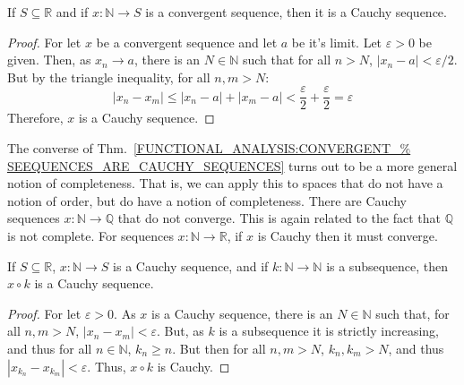             \begin{theorem}
                \label{FUNCTIONAL_ANALYSIS:CONVERGENT_%
                       SEEQUENCES_ARE_CAUCHY_SEQUENCES}
                If $S\subseteq\mathbb{R}$ and if
                $x:\mathbb{N}\rightarrow{S}$
                is a convergent sequence, then it
                is a Cauchy sequence.
            \end{theorem}
            \begin{proof}
                For let $x$ be a convergent sequence and
                let $a$ be it's limit.
                Let $\varepsilon>0$ be given. Then, as
                $x_{n}\rightarrow{a}$, there is an
                $N\in\mathbb{N}$ such that for all $n>N$,
                $|x_{n}-a|<\varepsilon/2$.
                But by the triangle inequality,
                for all $n,m>N$:
                \begin{equation}
                    |x_{n}-x_{m}|\leq
                    |x_{n}-a|+|x_{m}-a|<
                    \frac{\varepsilon}{2}+
                    \frac{\varepsilon}{2}
                    =\varepsilon
                \end{equation}
                Therefore, $x$ is a Cauchy sequence.
            \end{proof}
            The converse of
            Thm.~\ref{FUNCTIONAL_ANALYSIS:CONVERGENT_%
                      SEEQUENCES_ARE_CAUCHY_SEQUENCES}
            turns out to be a more general notion
            of completeness. That is, we can apply
            this to spaces that do not have
            a notion of order, but do have a notion
            of completeness. There are Cauchy sequences
            $x:\mathbb{N}\rightarrow\mathbb{Q}$ that do
            not converge. This is again related to the fact
            that $\mathbb{Q}$ is not complete. For sequences
            $x:\mathbb{N}\rightarrow\mathbb{R}$,
            if $x$ is Cauchy then it must converge.
            \begin{theorem}
                \label{THM:FUNCTIONAL_ANALYSIS:%
                       SUBSEQ_OF_CAUCHY_IS_CAUCHY}
                If $S\subseteq\mathbb{R}$,
                $x:\mathbb{N}\rightarrow{S}$ is a Cauchy sequence,
                and if $k:\mathbb{N}\rightarrow\mathbb{N}$
                is a subsequence, then
                $x\circ{k}$ is a Cauchy sequence.
            \end{theorem}
            \begin{proof}
                For let $\varepsilon>0$. As $x$ is a Cauchy
                sequence, there is an $N\in\mathbb{N}$ such that,
                for all $n,m>N$, $|x_{n}-x_{m}|<\varepsilon$.
                But, as $k$ is a subsequence it is strictly
                increasing, and thus for all $n\in\mathbb{N}$,
                $k_{n}\geq{n}$. But then for all $n,m>N$,
                $k_{n},k_{m}>N$, and thus
                $|x_{k_{n}}-x_{k_{m}}|<\varepsilon$. Thus,
                $x\circ{k}$ is Cauchy.
            \end{proof}
